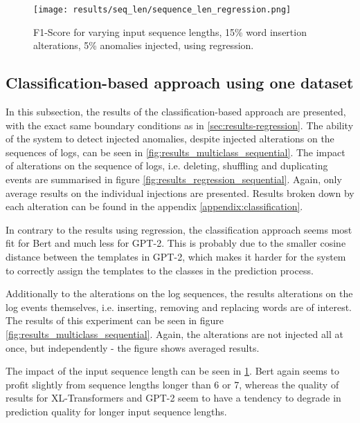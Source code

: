 


\begin{figure}[h]
  \centering
  \captionsetup{justification=centering}
  \texttt{[image: results/seq\_len/sequence\_len\_regression.png]}\\
  \caption{F1-Score for varying input sequence lengths, 15\% word insertion alterations, 5\% anomalies injected, using regression.}
  \label{fig:seq_len_regression}
\end{figure}





\subsection{Classification-based approach using one dataset \label{sec:results-classification}}
In this subsection, the results of the classification-based approach are presented, with the exact same boundary conditions as in \ref{sec:results-regression}. 
The ability of the system to detect injected anomalies, despite injected alterations on the sequences of logs, can be seen in \ref{fig:results_multiclass_sequential}. 
The impact of alterations on the sequence of logs, i.e. deleting, shuffling and duplicating events are summarised in figure \ref{fig:results_regression_sequential}. Again, only average results on the individual injections are presented. Results broken down by each alteration can be found in the appendix \ref{appendix:classification}. 

In contrary to the results using regression, the classification approach seems most fit for Bert and much less for GPT-2. This is probably due to the smaller cosine distance between the templates in GPT-2, which makes it harder for the system to correctly assign the templates to the classes in the prediction process.

Additionally to the alterations on the log sequences, the results alterations on the log events themselves, i.e. inserting, removing and replacing words are of interest. The results of this experiment can be seen in figure \ref{fig:results_multiclass_sequential}. Again, the alterations are not injected all at once, but independently - the figure shows averaged results.

The impact of the input sequence length can be seen in \ref{fig:seq_len_regression}. Bert again seems to profit slightly from sequence lengths longer than 6 or 7, whereas the quality of results for XL-Transformers and GPT-2 seem to have a tendency to degrade in prediction quality for longer input sequence lengths.


